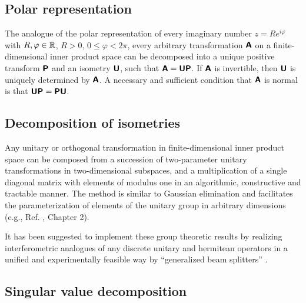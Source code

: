 \subsection{Polar representation}

The analogue of the polar representation of every imaginary number $z= R e^{i\varphi}$ with $R,\varphi \in {\Bbb R}$, $R>0$,
$0\le \varphi < 2\pi$,
every arbitrary transformation $\textsf{\textbf{A}}$ on a finite-dimensional inner product space can be decomposed into
a unique positive transform
$\textsf{\textbf{P}}$ and an isometry
$\textsf{\textbf{U}}$, such that $\textsf{\textbf{A}}= \textsf{\textbf{U}} \textsf{\textbf{P}}$.
If $\textsf{\textbf{A}}$ is invertible, then $\textsf{\textbf{U}}$  is uniquely determined by
$\textsf{\textbf{A}}$.
A necessary and sufficient condition that $\textsf{\textbf{A}}$ is normal is that
$\textsf{\textbf{U}} \textsf{\textbf{P}}=\textsf{\textbf{P}} \textsf{\textbf{U}} $.

\subsection{Decomposition of isometries}

Any unitary or orthogonal transformation   in finite-dimensional inner product space
can be composed from a succession of two-parameter unitary transformations in
two-dimensional subspaces,
and a multiplication of a single diagonal matrix with elements of modulus one
in an algorithmic, constructive and tractable manner.
The method is similar to Gaussian elimination and facilitates the parameterization of elements
of the unitary group  in arbitrary dimensions (e.g., Ref. \cite{murnaghan}, Chapter 2).

{\color{Purple}
It has been suggested to implement
these group theoretic results by realizing interferometric analogues
of any discrete unitary and hermitean operators
in a unified and experimentally feasible way by ``generalized beam splitters''   \cite{rzbb,reck-94}.}


\subsection{Singular value decomposition}


